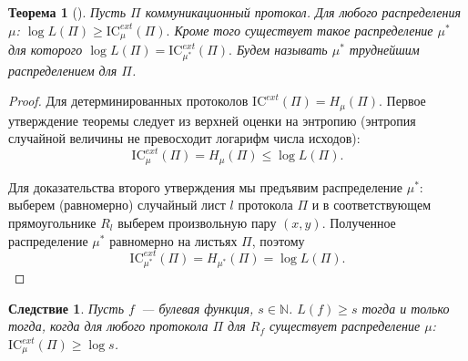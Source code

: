 \documentclass[12pt]{article}
\newcommand{\IC}{\mathrm{IC}}
\newcommand{\Nat}{\mathbb{N}}
\theoremstyle{definition}
\theoremstyle{plain}
\newtheorem{theorem}{Теорема}[section]
\newtheorem{corollary}{Следствие}[section]
\theoremstyle{remark}
\begin{document}
\begin{theorem}[\cite{DMWW12}]
    Пусть $\Pi$ коммуникационный протокол. Для любого распределения $\mu$:
    \(
        \log L(\Pi) \ge \IC_\mu^{ext}(\Pi).
    \)
    Кроме того существует такое распределение $\mu^*$ для которого 
    \(
    \log L(\Pi) = \IC_{\mu^*}^{ext}(\Pi).
    \)
    Будем называть $\mu^*$ \emph{труднейшим} распределением для $\Pi$.
\end{theorem}
\begin{proof} Для детерминированных протоколов $\IC^{ext}(\Pi) = H_\mu(\Pi)$.
    Первое утверждение теоремы следует из верхней оценки на энтропию (энтропия
    случайной величины не превосходит логарифм числа исходов):
    \[
    \IC_\mu^{ext}(\Pi) = H_\mu(\Pi) \le \log L(\Pi).
    \]

    Для доказательства второго утверждения мы предъявим распределение $\mu^*$:
    выберем (равномерно) случайный лист $l$ протокола $\Pi$ и в соответствующем 
    прямоугольнике $R_l$ выберем произвольную пару $(x,y)$. Полученное
    распределение $\mu^*$ равномерно на листьях $\Pi$, поэтому
    \[
    \IC_{\mu^*}^{ext}(\Pi) = H_{\mu^*}(\Pi) = \log L(\Pi).
    \]
\end{proof}
\begin{corollary}
    Пусть $f$~--- булевая функция, $s\in\Nat$. $L(f)\ge s$ тогда и только тогда,
    когда для любого протокола $\Pi$ для $R_f$ существует распределение $\mu$:
    $\IC_\mu^{ext}(\Pi)\ge \log s$.
\end{corollary}
\end{document}
